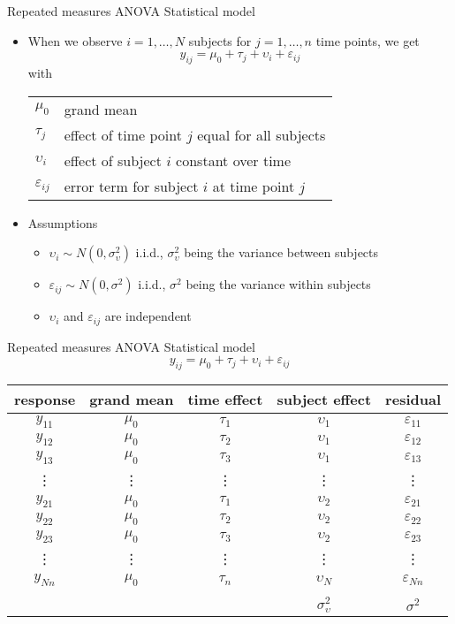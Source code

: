 \documentclass{beamer}
\begin{document}
\begin{frame}{Repeated measures ANOVA}
  {Statistical model}
  \begin{itemize}
    \item When we observe $i = 1, \ldots, N$ subjects for $j = 1, \ldots,
      n$ time points, we get
\[
  y_{ij} = \mu_0 + \tau_j + \upsilon_i + \varepsilon_{ij}
\]
with 

\begin{tabular}{ll}
  $\mu_0$ & grand mean\\
  $\tau_j$ & effect of time point $j$ equal for all subjects\\
  $\upsilon_i$ & effect of subject $i$ constant over time\\
  $\varepsilon_{ij}$ & error term for subject $i$ at time point $j$
\end{tabular}

\item Assumptions
\begin{itemize}
\item $\upsilon_i \sim N(0, \sigma^2_\upsilon)$ i.i.d.,
  $\sigma^2_\upsilon$ being the variance between subjects
\item $\varepsilon_{ij} \sim N(0, \sigma^2)$ i.i.d., $\sigma^2$ being
      the variance within subjects
    \item $\upsilon_i$ and $\varepsilon_{ij}$ are independent
\end{itemize}
  \end{itemize}
\end{frame}

\begin{frame}{Repeated measures ANOVA}
  {Statistical model}
  \[
  y_{ij} = \mu_0 + \tau_j + \upsilon_i + \varepsilon_{ij}
  \]

  \begin{tabular}{ccccc}
    \hline
    response & grand mean & time effect & subject effect  & residual \\
    \hline
    $y_{11}$ & $\mu_0$ & $\tau_1$  & $\upsilon_{1}$ & $\varepsilon_{11}$ \\
    $y_{12}$ & $\mu_0$ & $\tau_2$  & $\upsilon_{1}$ & $\varepsilon_{12}$ \\
    $y_{13}$ & $\mu_0$ & $\tau_3$  & $\upsilon_{1}$ & $\varepsilon_{13}$ \\
    \vdots & \vdots & \vdots   &  \vdots & \vdots \\
    $y_{21}$ & $\mu_0$ & $\tau_1$  & $\upsilon_{2}$ & $\varepsilon_{21}$ \\
    $y_{22}$ & $\mu_0$ & $\tau_2$  & $\upsilon_{2}$ & $\varepsilon_{22}$ \\
    $y_{23}$ & $\mu_0$ & $\tau_3$  & $\upsilon_{2}$ & $\varepsilon_{23}$ \\
    \vdots & \vdots & \vdots   &  \vdots & \vdots \\
    $y_{Nn}$ & $\mu_0$ & $\tau_n$  & $\upsilon_{N}$ & $\varepsilon_{Nn}$ \\
    \hline\\[-2ex]
    \only<2>{$\sigma_{\upsilon}^2 + \sigma^2$ & & &
    $\sigma_{\upsilon}^2$ & $\sigma^2$} \\
  \end{tabular}
\end{frame}
\end{document}
